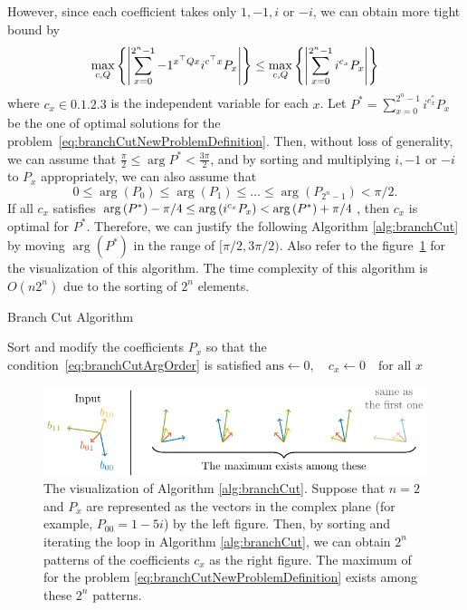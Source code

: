 \documentclass[a4paper, onecolumn, 11pt, longbibliography]{quantumarticle}
\begin{document}
However, since each coefficient takes only $1, -1, i$ or $-i$,
we can obtain more tight bound by
\begin{equation}\label{eq:branchCutNewProblemDefinition}
  \max_{c,Q} \qty{ \abs{\sum_{x=0}^{2^n-1} -1^{x^\top Q x} i^{c^\top x} P_x} }
  \leq \max_{c,Q} \qty{ \abs{\sum_{x=0}^{2^n-1} i^{c_x} P_x} }
\end{equation}
where $c_x \in \qty{0, 1, 2, 3}$ is the independent variable for each $x$.
Let $P^* = \sum_{x=0}^{2^n-1} i^{c_x^*} P_x$ be
the one of optimal solutions for the problem~\eqref{eq:branchCutNewProblemDefinition}.
Then, without loss of generality,
we can assume that $\frac{\pi}{2} \leq \arg P^* < \frac{3\pi}{2}$,
and by sorting and multiplying $i,-1$ or $-i$ to $P_x$ appropriately,
we can also assume that
\begin{equation}\label{eq:branchCutArgOrder}
  0 \leq \arg{(P_0)} \leq \arg{(P_1)} \leq \dots \leq \arg{(P_{2^n-1})} < \pi/2.
\end{equation}
If all $c_x$ satisfies $\arg{(P^*)} - \pi/4 \leq \arg{\qty(i^{c_x} P_x)} < \arg{(P^*)} + \pi/4$,
then $c_x$ is optimal for $P^*$.
Therefore, we can justify the following Algorithm \ref{alg:branchCut}
by moving $\arg(P^*)$ in the range of $[\pi/2, 3\pi/2)$.
Also refer to the figure~\ref{fig:argsort} for the visualization of this algorithm.
The time complexity of this algorithm is $O(n2^n)$
due to the sorting of $2^n$ elements.

\begin{algorithm}
  \caption{Branch Cut Algorithm}
  \label{alg:branchCut}
  Sort and modify the coefficients $P_x$ so that the condition~\eqref{eq:branchCutArgOrder} is satisfied\;
  $\mathrm{ans} \leftarrow 0, \quad c_x \leftarrow 0 \quad \text{for all } x$\;
\end{algorithm}

\begin{figure}[htbp]
  \centering
  \includegraphics[width=\columnwidth]{imgs/argsort.pdf}
  \caption{
    The visualization of Algorithm \ref{alg:branchCut}.
    Suppose that $n=2$ and $P_x$ are represented as the vectors in the complex plane
    (for example, $P_{00} = 1-5i$) by the left figure.
    Then, by sorting and iterating the loop in Algorithm \ref{alg:branchCut},
    we can obtain $2^n$ patterns of the coefficients $c_x$ as the right figure.
    The maximum of for the problem \eqref{eq:branchCutNewProblemDefinition}
    exists among these $2^n$ patterns.
  }
  \label{fig:argsort}
\end{figure}
\end{document}
